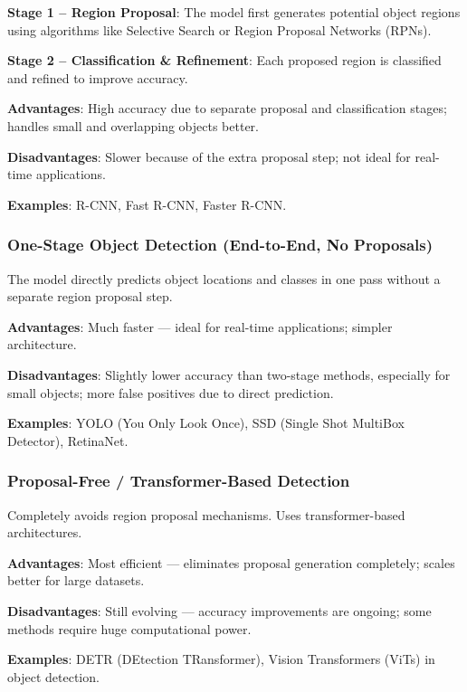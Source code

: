 \documentclass[11pt,a4paper]{article}
\begin{document}
\textbf{Stage 1 -- Region Proposal}: The model first generates potential object regions using algorithms like Selective Search or Region Proposal Networks (RPNs).

\textbf{Stage 2 -- Classification \& Refinement}: Each proposed region is classified and refined to improve accuracy.

\textbf{Advantages}: High accuracy due to separate proposal and classification stages; handles small and overlapping objects better.

\textbf{Disadvantages}: Slower because of the extra proposal step; not ideal for real-time applications.

\textbf{Examples}: R-CNN, Fast R-CNN, Faster R-CNN.

\subsubsection{One-Stage Object Detection (End-to-End, No Proposals)}

The model directly predicts object locations and classes in one pass without a separate region proposal step.

\textbf{Advantages}: Much faster --- ideal for real-time applications; simpler architecture.

\textbf{Disadvantages}: Slightly lower accuracy than two-stage methods, especially for small objects; more false positives due to direct prediction.

\textbf{Examples}: YOLO (You Only Look Once), SSD (Single Shot MultiBox Detector), RetinaNet.

\subsubsection{Proposal-Free / Transformer-Based Detection}

Completely avoids region proposal mechanisms. Uses transformer-based architectures.

\textbf{Advantages}: Most efficient --- eliminates proposal generation completely; scales better for large datasets.

\textbf{Disadvantages}: Still evolving --- accuracy improvements are ongoing; some methods require huge computational power.

\textbf{Examples}: DETR (DEtection TRansformer), Vision Transformers (ViTs) in object detection.
\end{document}
